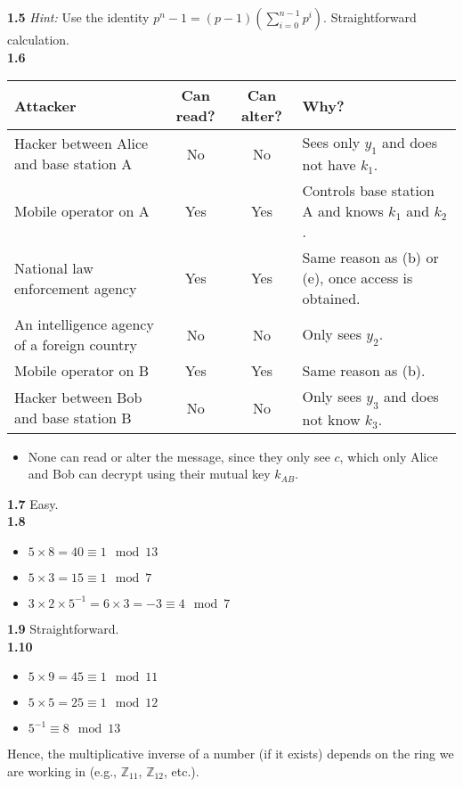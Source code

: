 \textbf{1.5} \textit{Hint:} Use the identity $p^n - 1 = (p - 1)\left(\sum_{i=0}^{n-1} p^i\right)$. Straightforward calculation. \\

\textbf{1.6}\\

    \begin{tabular}{|p{4cm}|c|c|p{4cm}|}
        \hline
        Attacker & Can read? & Can alter? & Why? \\
        \hline     
        Hacker between Alice and base station A & No & No & Sees only $y_1$ and does not have $k_1$. \\
        \hline
        Mobile operator on A & Yes & Yes & Controls base station A and knows $k_1$ and $k_2$. \\
        \hline
        National law enforcement agency & Yes & Yes & Same reason as (b) or (e), once access is obtained. \\
        \hline
        An intelligence agency of a foreign country & No & No & Only sees $y_2$. \\
        \hline
        Mobile operator on B & Yes & Yes & Same reason as (b). \\
        \hline
        Hacker between Bob and base station B & No & No & Only sees $y_3$ and does not know $k_3$. \\
        \hline
    \end{tabular}
    \begin{itemize}

    
        \item None can read or alter the message, since they only see $c$, which only Alice and Bob can decrypt using their mutual key $k_{AB}$.
    \end{itemize}

\textbf{1.7} Easy. \\

\textbf{1.8}
\begin{itemize}
    \item $5 \times 8 = 40 \equiv 1 \mod{13}$
    \item $5 \times 3 = 15 \equiv 1 \mod{7}$
    \item $3 \times 2 \times 5^{-1} = 6 \times 3 = -3 \equiv 4 \mod{7}$
\end{itemize}

\textbf{1.9} Straightforward. \\

\textbf{1.10}
\begin{itemize}
    \item $5 \times 9 = 45 \equiv 1 \mod{11}$
    \item $5 \times 5 = 25 \equiv 1 \mod{12}$
    \item $5^{-1} \equiv 8 \mod{13}$
\end{itemize}
Hence, the multiplicative inverse of a number (if it exists) depends on the ring we are working in (e.g., $\mathbb{Z}_{11}$, $\mathbb{Z}_{12}$, etc.). \\

